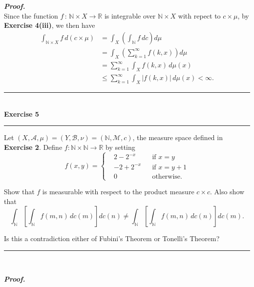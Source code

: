 \documentclass[a4paper,11pt]{article}
\begin{document}
\textbf{\textit{Proof.}}\\

Since the function $f\,:\,\mathbb{N} \times X \to \mathbb{R}$ is integrable over $\mathbb{N} \times X$ with repect to $c \times \mu$, by \textbf{Exercise 4(iii)}, we then have
	$$\begin{aligned}
	\int_{\mathbb{N} \times X} f\,d(c \times \mu)
	&= \int_X \left( \int_{\mathbb{N}} f\,dc\right)d\mu\\
	&= \int_X \left( \sum_{k=1}^\infty f(k,x) \right) d\mu\\
	&= \sum_{k=1}^\infty\int_X f(k,x)\,d\mu(x)\\
	&\leq \sum_{k=1}^\infty\int_X|f(k,x)|\,d\mu(x)
	< \infty.
	\end{aligned}$$




\begin{flushleft}
	\rule[-0.5ex]{17cm}{2pt}\\
		\textbf{Exercise 5}\\
	\rule[1.5ex]{17cm}{0.5pt}
		Let $(X, \mathcal{A}, \mu) = (Y, \mathcal{B}, \nu) = (\mathbb{N}, \mathcal{M}, c)$, the measure space defined in \textbf{Exercise 2}. Define $f: \mathbb{N} \times \mathbb{N} \to \mathbb{R}$ by setting
			$$f(x,y) = \left\{\begin{matrix}
			&2 - 2^{-x} &&\text{if }x = y\\
			& -2 + 2^{-x} &&\text{if }x = y + 1\\
			& 0 &&\text{otherwise.}
			\end{matrix}\right.$$

		Show that $f$ is measurable with respect to the product measure $c \times c$. Also show that
			$$\int_{\mathbb{N}} \left[\int_{\mathbb{N}} f(m,n)\,dc(m)\right]dc(n)
			\neq
			\int_{\mathbb{N}} \left[\int_{\mathbb{N}} f(m,n)\,dc(n)\right]dc(m).$$

		Is this a contradiction either of Fubini's Theorem or Tonelli's Theorem?
	\rule[1.0ex]{17cm}{0.5pt}\
\end{flushleft}

\textbf{\textit{Proof.}}
\end{document}
